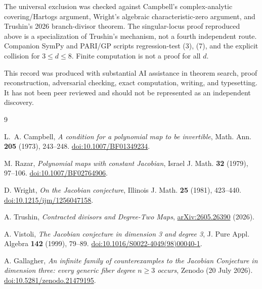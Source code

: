 \documentclass[11pt]{article}
\theoremstyle{remark}
\begin{document}
The universal exclusion was checked against Campbell's complex-analytic
covering/Hartogs argument, Wright's algebraic characteristic-zero argument,
and Trushin's 2026 branch-divisor theorem.  The singular-locus proof
reproduced above is a specialization of Trushin's mechanism, not a fourth
independent route. Companion SymPy and PARI/GP
scripts regression-test (3), (7), and the explicit collision for
$3\leq d\leq8$.  Finite computation is not a proof for all $d$.

This record was produced with substantial AI assistance in theorem search,
proof reconstruction, adversarial checking, exact computation, writing, and
typesetting.  It has not been peer reviewed and should not be represented as
an independent discovery.

\begin{thebibliography}{9}

L.~A. Campbell,
\emph{A condition for a polynomial map to be invertible},
Math. Ann. \textbf{205} (1973), 243--248.
\href{https://doi.org/10.1007/BF01349234}{doi:10.1007/BF01349234}.\par\smallskip

M. Razar,
\emph{Polynomial maps with constant Jacobian},
Israel J. Math. \textbf{32} (1979), 97--106.
\href{https://doi.org/10.1007/BF02764906}{doi:10.1007/BF02764906}.\par\smallskip

D. Wright,
\emph{On the Jacobian conjecture},
Illinois J. Math. \textbf{25} (1981), 423--440.
\href{https://doi.org/10.1215/ijm/1256047158}{doi:10.1215/ijm/1256047158}.\par\smallskip

A. Trushin,
\emph{Contracted divisors and Degree-Two Maps},
\href{https://arxiv.org/abs/2605.26390}{arXiv:2605.26390} (2026).\newline

A. Vistoli,
\emph{The Jacobian conjecture in dimension 3 and degree 3},
J. Pure Appl. Algebra \textbf{142} (1999), 79--89.
\href{https://doi.org/10.1016/S0022-4049(98)00040-1}
{doi:10.1016/S0022-4049(98)00040-1}.\par\smallskip

A. Gallagher,
\emph{An infinite family of counterexamples to the Jacobian Conjecture in
dimension three: every generic fiber degree $n\geq3$ occurs},
Zenodo (20 July 2026).
\href{https://doi.org/10.5281/zenodo.21479195}
{doi:10.5281/zenodo.21479195}.

\end{thebibliography}
\end{document}

